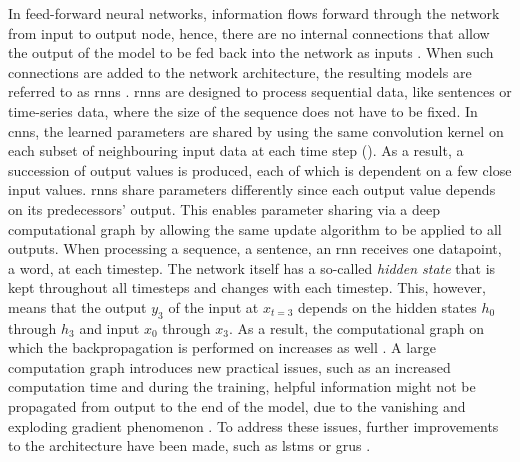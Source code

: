 In feed-forward neural networks, information flows forward through the network from input to output node, hence, there are no internal connections that allow
the output of the \gls{model} to be fed back into the network as inputs \cite{aggarwal2018NeuralNetworksDeep, Goodfellow-et-al-2016}.
When such connections are added to the network architecture, the resulting models are referred to as \glspl{rnn} \cite{rumelhart1986LearningInternalRepresentations}.
\Glspl{rnn} are designed to process sequential data, like sentences or time-series data, where the size of the sequence does not have to be fixed.
In \glspl{cnn}, the learned parameters are shared by using the same convolution kernel on each subset of neighbouring input data at each time step (). 
As a result, a succession of output values is produced, each of which is dependent on a few close input values. 
\glspl{rnn} share parameters differently since each output value depends on its predecessors' output. 
This enables parameter sharing via a deep computational graph by allowing the same update algorithm to be applied to all outputs.
When processing a sequence, \eg a sentence, an \gls{rnn} receives one datapoint, \eg a word, at each timestep.
The network itself has a so-called \textit{hidden state} that is kept throughout all timesteps and changes with each timestep.
This, however, means that the output $y_3$ of the input at $x_{t=3}$ depends on the hidden states $h_0$ through $h_3$ and input $x_0$ through $x_3$.
As a result, the computational graph on which the backpropagation is performed on increases as well \cite{aggarwal2018NeuralNetworksDeep}.
A large computation graph introduces new practical issues, such as an increased computation time and during the training, helpful information might not be propagated from output to the end of the \gls{model},
due to the vanishing and exploding gradient phenomenon \cite{aggarwal2018NeuralNetworksDeep}.
To address these issues, further improvements to the architecture have been made, such as \glspl{lstm} \cite{hochreiter1997LongShortTermMemory} or \glspl{gru} \cite{cho2014PropertiesNeuralMachine}.

